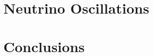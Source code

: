 \documentclass{ucbthesis}
\begin{document}
\listoftodos

\chapter{Neutrino Oscillations}
\label{ch:intro}













\chapter{Conclusions}

\printbibliography

\appendix


\end{document}
